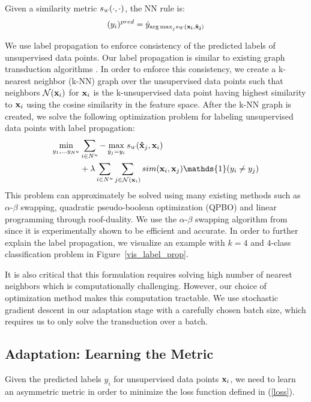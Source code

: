 Given a similarity metric $\sw(\cdot,\cdot)$, the NN rule is:
\begin{equation}
(y_i)^{pred} = \hat{y}_{{\arg\max}_j \sw(\mathbf{x_i}, \mathbf{\hat{x}_j})}
\end{equation}

We use label propagation to enforce consistency of the predicted labels of unsupervised data points. Our label propagation is similar to existing graph transduction algorithms \cite{label_prop1,label_prop2}. In order to enforce this consistency, we create a k-nearest neighbor (k-NN) graph over the unsupervised data points such that neighbors $\mathcal{N}(\mathbf{x}_i)$ for $\mathbf{x}_i$ is the k-unsupervised data point having highest similarity to $\mathbf{x}_i$ using the cosine similarity in the feature space. After the k-NN graph is created, we solve the following optimization problem for labeling unsupervised data points with label propagation:
\begin{equation}
\begin{aligned}
\min_{y_1, \ldots y_{N^u}}  &\sum_{i \in N^u} - \max_{\hat{y}_j=y_i}  \sw(\mathbf{\hat{x}}_j,\mathbf{x}_{i}) \\
&+ \lambda
\sum_{i \in N^u} \sum_{j \in \mathcal{N}(\mathbf{x}_i)} sim(\mathbf{x}_i, \mathbf{x}_j) \mathds{1}(y_i \neq y_j)
\end{aligned}
\label{robtran}
\end{equation}
This problem can approximately be solved using many existing methods such as $\alpha$-$\beta$ swapping, quadratic pseudo-boolean optimization (QPBO) and linear programming through roof-duality. We use the $\alpha$-$\beta$ swapping algorithm from \cite{kolmogrovalphabeta} since it is experimentally shown to be efficient and accurate. In order to further explain the label propagation, we visualize an example with $k=4$ and $4$-class classification problem in Figure~\ref{vis_label_prop}. 

It is also critical that this formulation requires solving high number of nearest neighbors which is computationally challenging. However, our choice of optimization method makes this computation tractable. We use stochastic gradient descent in our adaptation stage with a carefully chosen batch size, which requires us to only solve the transduction over a batch. %

\subsection{Adaptation: Learning the Metric}
\label{metric}
Given the predicted labels $y_i$ for unsupervised data points $\mathbf{x}_i$, we need to learn an asymmetric metric in order to minimize the loss function defined in (\ref{loss}). 

